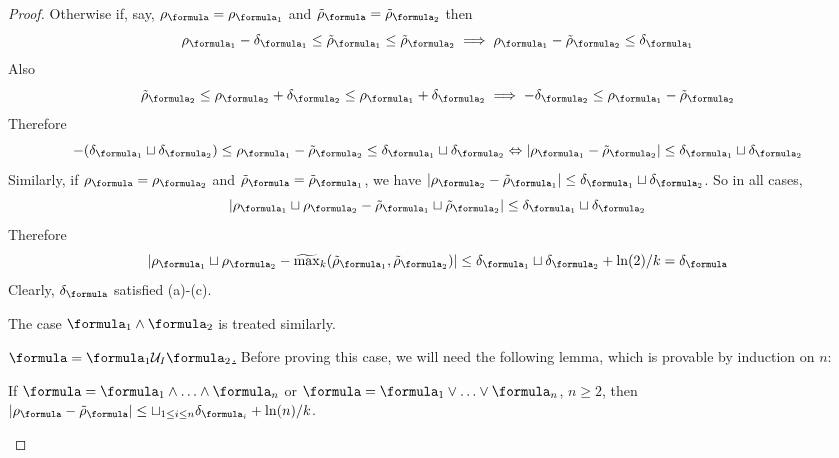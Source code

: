 \begin{proof}
Otherwise if, say, $\robf = \rob_{\formula_1}$ and $\srobf = \srob_{\formula_2}$ then
\[\robfa -\delta_{\formula_1} \leq \srob_{\formula_1} \leq \srob_{\formula_2} \implies \robfa-\srob_{\formula_2} \leq \delta_{\formula_1}\]
Also 
\[\srob_{\formula_2} \leq \robfb+\delta_{\formula_2} \leq \robfa + \delta_{\formula_2} \implies -\delta_{\formula_2} \leq \robfa - \srob_{\formula_2}\]
Therefore
\begin{equation*}
\label{eq:inter}
-(\delta_{\formula_1} \sqcup \delta_{\formula_2})\leq \robfa - \srob_{\formula_2}\leq \delta_{\formula_1} \sqcup \delta_{\formula_2} \Leftrightarrow |\robfa - \srob_{\formula_2}|\leq \delta_{\formula_1} \sqcup \delta_{\formula_2}
\end{equation*}
Similarly, if $\robf = \rob_{\formula_2}$ and $\srobf = \srob_{\formula_1}$, we have $|\robfb - \srob_{\formula_1}|\leq  \delta_{\formula_1} \sqcup \delta_{\formula_2}$.
So in all cases, 
\[|\robfa \sqcup \robfb - \srob_{\formula_1} \sqcup \srob_{\formula_2}|\leq \delta_{\formula_1} \sqcup \delta_{\formula_2}\]
Therefore 
\[|\robfa \sqcup \robfb - \smax_k(\srob_{\formula_1} , \srob_{\formula_2})|\leq  \delta_{\formula_1} \sqcup \delta_{\formula_2} + \ln(2)/k  = \delta_\formula\]
Clearly, $\delta_\formula$ satisfied (a)-(c).

The case $\formula_1 \land \formula_2$ is treated similarly.

\underline{$\formula = \formula_1 \until_I \formula_2$.} 
Before proving this case, we will need the following lemma, which is provable by induction on $n$:
\begin{lemma}
	\label{lemma:n-ary apx}
	If $\formula = \formula_1\land \ldots\land \formula_n$ or $\formula = \formula_1\lor \ldots\lor \formula_n$, $n\geq 2$, then 
	$|\robf - \srobf| \leq \sqcup_{1\leq i \leq n}\delta_{\formula_i} + \ln(n)/k$.
\end{lemma}


\end{proof}
